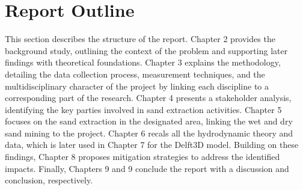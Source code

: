 \section{Report Outline}
\label{section: report outline}
This section describes the structure of the report. Chapter 2 provides the background study, outlining the context of the problem and supporting later findings with theoretical foundations. Chapter 3 explains the methodology, detailing the data collection process, measurement techniques, and the multidisciplinary character of the project by linking each discipline to a corresponding part of the research. Chapter 4 presents a stakeholder analysis, identifying the key parties involved in sand extraction activities. Chapter 5 focuses on the sand extraction in the designated area, linking the wet and dry sand mining to the project. Chapter 6 recals all the hydrodynamic theory and data, which is later used in Chapter 7 for the Delft3D model. Building on these findings, Chapter 8 proposes mitigation strategies to address the identified impacts. Finally, Chapters 9 and 9 conclude the report with a discussion and conclusion, respectively.











